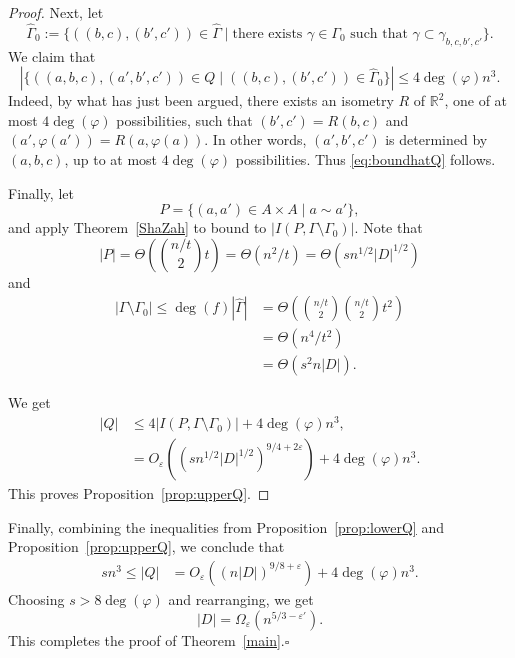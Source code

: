 \documentclass[letterpaper, reqno,11pt]{article}
\newcommand{\RR}{\mathbb{R}}
\newcommand{\eps}{\varepsilon}
\theoremstyle{definition}
\theoremstyle{remark}
\begin{document}
\begin{proof}
Next, let
$$
\hat \Gamma_0:=\{((b,c),(b',c'))\in \hat\Gamma\mid \text{there exists $\gamma\in\Gamma_0$ such that $\gamma\subset \gamma_{b,c,b',c'}$}\}.
$$
We claim that 
\begin{equation}\label{eq:boundhatQ}
|\{((a,b,c),(a',b',c'))\in Q\mid ((b,c),(b',c'))\in \hat\Gamma_0\}|\le 4\deg (\varphi) n^3.
\end{equation}
Indeed, by what has just been argued, there exists an isometry $R$ of $\RR^2$, one of at most $4\deg (\varphi)$ possibilities, such that 
$(b',c')=R(b,c)$ and $(a',\varphi(a'))=R(a,\varphi(a))$. In other words, $(a',b',c')$ is determined by $(a,b,c)$, up to at most $4\deg (\varphi)$ possibilities.
Thus \eqref{eq:boundhatQ} follows.

Finally, let
$$
P=\{(a,a')\in A\times A\mid a\sim a'\},
$$
and apply Theorem~\ref{ShaZah} to bound to $|I(P,\Gamma\setminus\Gamma_0)|$. 
Note that 
$$
|P|=\Theta\left(\binom{n/t}{2}t\right)=\Theta(n^2/t)=\Theta(sn^{1/2}|D|^{1/2})
$$ 
and 
\begin{align*}
|\Gamma\setminus\Gamma_0|\le \deg(f)|\hat\Gamma|
&=\Theta\left(\binom{n/t}{2}\binom{n/t}{2}t^2\right)\\
&=\Theta(n^4/t^2)\\
&=\Theta(s^2n|D|).
\end{align*}





We get
\begin{align*}
|Q|
&\le
4|I(P,\Gamma\setminus\Gamma_0)|+
4\deg (\varphi) n^3,\\
&=O_\eps\left(
(sn^{1/2}|D|^{1/2})^{9/4+2\eps}\right)+
4\deg (\varphi) n^3.
\end{align*}
This proves Proposition~\ref{prop:upperQ}.
\end{proof}

Finally, combining the inequalities from Proposition~\ref{prop:lowerQ} and Proposition~\ref{prop:upperQ}, we conclude that
\begin{align*}
sn^3\le |Q| 
&=O_\eps\left(
(n|D|)^{9/8+\eps}\right)
+
4\deg (\varphi) n^3.
\end{align*}
Choosing $s>8\deg(\varphi)$ and rearranging, we get
$$
|D|=\Omega_\eps(n^{5/3-\eps'}).$$
This completes the proof of Theorem~\ref{main}.\hfill$\square$
\end{document}

